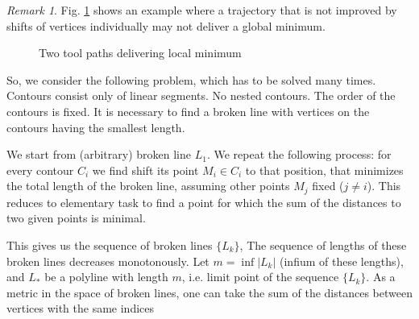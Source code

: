 \documentclass[]{interact}
\theoremstyle{plain}%
\theoremstyle{definition}
\theoremstyle{remark}
\newtheorem{remark}{Remark}
\begin{document}
\begin{remark}
Fig. \ref{counter-example} shows an example where a trajectory
that is not improved by shifts of vertices individually
may not deliver a global minimum.

\begin{figure}
  \begin{center}
  \end{center}
  \caption{Two tool paths delivering local minimum}
  \label{counter-example}
  \end{figure}
\end{remark}

So,
we consider the following problem,
which has to be solved many times.
Contours consist only of linear segments.
No nested contours.
The order of the contours is fixed.
It is necessary to find a broken line with vertices
on the contours
having the smallest length.

We start from
(arbitrary)
broken line
$L_1$.
We repeat the following process:
for every contour
$C_i$
we find shift its point
$M_i \in C_i$
to that position,
that minimizes the total
length of the broken line,
assuming other points
$M_j$ fixed
($j \ne i$).
This reduces to elementary task
to find a point for which
the sum of the distances to two given points is minimal.

This gives us
the sequence of broken lines
$\{L_k\}$,
The sequence of lengths of these broken lines
decreases monotonously.
Let
$m = \inf |L_k|$
(infium of these lengths),
and
$L_*$ be a polyline with length $m$,
i.e. limit point of the sequence
$\{L_k\}$.
As a metric in the space of broken lines,
one can take the sum of the distances
between vertices with the same indices
\end{document}
